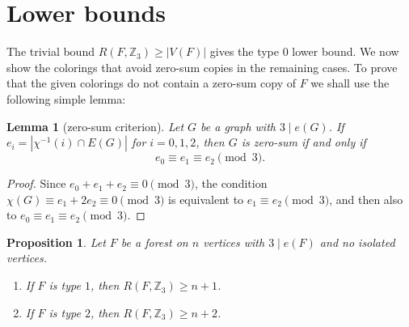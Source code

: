 \documentclass[11pt]{article}
\newtheorem{lemma}[theorem]{Lemma}
\newtheorem{proposition}[theorem]{Proposition}
\newcommand{\Z}{\mathbb Z}
\begin{document}

\section{Lower bounds}\label{sec:lower}

The trivial bound $R(F,\Z_3)\ge |V(F)|$ gives the type $0$ lower bound.  We now show the colorings that avoid zero-sum copies in the remaining cases. To prove that the given colorings do not contain a zero-sum copy of $F$ we shall use the following simple lemma:

\begin{lemma}[zero-sum criterion]\label{lem:criterion}
Let $G$ be a graph with $3\mid e(G)$.  If $e_i=|\chi^{-1}(i)\cap E(G)|$ for $i=0,1,2$, then $G$ is zero-sum if and only if
\[
       e_0\equiv e_1\equiv e_2 \pmod 3.
\]
\end{lemma}

\begin{proof}
Since $e_0+e_1+e_2\equiv0\pmod 3$, the condition $\chi(G) \equiv e_1+2e_2\equiv0 \pmod 3$ is equivalent to $e_1\equiv e_2 \pmod 3$, and then also to $e_0\equiv e_1\equiv e_2 \pmod 3$.
\end{proof}


\begin{proposition}\label{prop:lower}
Let $F$ be a forest on $n$ vertices with $3\mid e(F)$ and no isolated vertices.
\begin{enumerate}[label=(\alph*),leftmargin=2.2em]
\item If $F$ is type $1$, then $R(F,\Z_3)\ge n+1$.
\item If $F$ is type $2$, then $R(F,\Z_3)\ge n+2$.
\end{enumerate}
\end{proposition}
\end{document}
